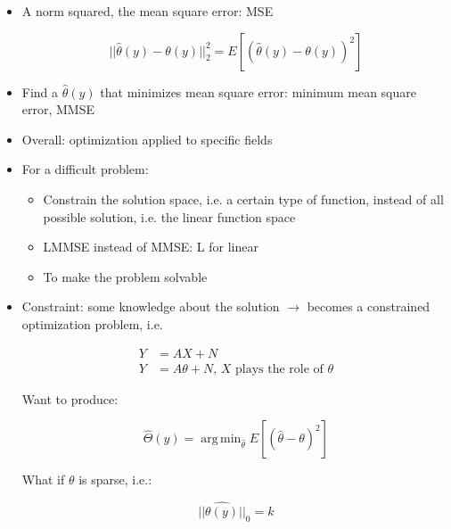 \documentclass[11pt,letterpaper,titlepage]{article}
\DeclareMathOperator*{\argmin}{arg\,min}
\begin{document}
\begin{itemize}
    
    \item A norm squared, the mean square error: MSE
    
    \begin{equation*}
        ||\hat{\theta}(y) - \theta(y)||_2^2 = E[(\hat{\theta}(y) - \theta(y))^2]
    \end{equation*}
    
    \item Find a $\hat{\theta}(y)$ that minimizes mean square error: minimum mean square error, MMSE
    
    \item Overall: optimization applied to specific fields
    
    \item For a difficult problem:
    
    \begin{itemize}
        
        \item Constrain the solution space, i.e. a certain type of function, instead of all possible solution, i.e. the linear function space
        
        \item LMMSE instead of MMSE: L for linear
        
        \item To make the problem solvable
        
    \end{itemize}
    
    \item Constraint: some knowledge about the solution $\rightarrow$ becomes a constrained optimization problem, i.e.
    
    \begin{equation*}
        \begin{aligned}
            Y &= AX + N \\
            Y &= A \theta + N \text{, $X$ plays the role of $\theta$}
        \end{aligned}
    \end{equation*}
    
    Want to produce:
    
    \begin{equation*}
        \hat{\Theta}(y) = \argmin_{\hat{\theta}} E[(\hat{\theta} - \theta)^2]
    \end{equation*}
    
    What if $\theta$ is sparse, i.e.:
    
    \begin{equation*}
        ||\hat{\theta(y)}||_{0} = k
    \end{equation*}
    
\end{itemize}
\end{document}
